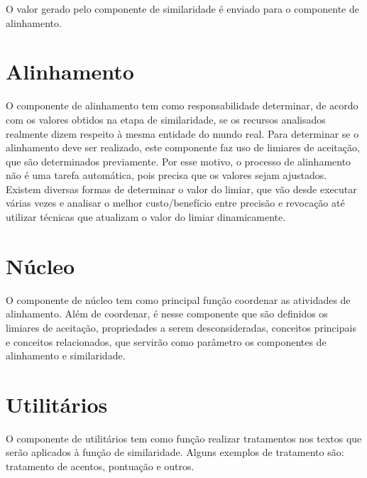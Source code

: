 


O valor gerado pelo componente de similaridade é enviado para o componente de alinhamento.
\section{Alinhamento}
O componente de alinhamento tem como responsabilidade determinar, de acordo com os valores obtidos na etapa de similaridade, se os recursos analisados realmente dizem respeito à mesma entidade do mundo real. Para determinar se o alinhamento deve ser realizado, este componente faz uso de limiares de aceitação, que são determinados previamente. Por esse motivo, o processo de alinhamento não é uma tarefa automática, pois precisa que os valores sejam ajustados. Existem diversas formas de determinar o valor do limiar, que vão desde executar várias vezes e analisar o melhor custo/benefício entre precisão e revocação até utilizar técnicas que atualizam o valor do limiar dinamicamente.


\section{Núcleo}
O componente de núcleo tem como principal função coordenar as atividades de alinhamento. Além de coordenar, é nesse componente que são definidos os limiares de aceitação, propriedades a serem desconsideradas, conceitos principais e conceitos relacionados, que servirão como parâmetro os componentes de alinhamento e similaridade.


\section{Utilitários}
O componente de utilitários tem como função realizar tratamentos nos textos que serão aplicados à função de similaridade. Alguns exemplos de tratamento são: tratamento de acentos, pontuação e outros.

